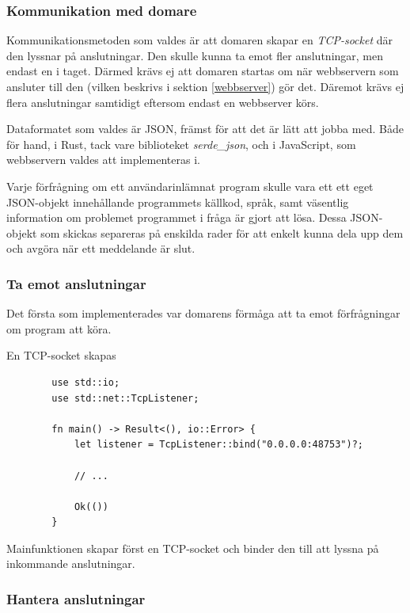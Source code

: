 \documentclass{article}
\begin{document}
\subsubsection{Kommunikation med domare}

Kommunikationsmetoden som valdes är att domaren skapar en \textit{TCP-socket}
där den lyssnar på anslutningar. Den skulle kunna ta emot fler anslutningar, men
endast en i taget. Därmed krävs ej att domaren startas om när webbservern som
ansluter till den (vilken beskrivs i sektion \ref{webbserver}) gör det. Däremot
krävs ej flera anslutningar samtidigt eftersom endast en webbserver körs.

Dataformatet som valdes är JSON, främst för att det är lätt att jobba med. Både
för hand, i Rust, tack vare biblioteket \textit{serde\_json}, och i JavaScript,
som webbservern valdes att implementeras i.

Varje förfrågning om ett användarinlämnat program skulle vara ett ett eget
JSON-objekt innehållande programmets källkod, språk, samt väsentlig information
om problemet programmet i fråga är gjort att lösa. Dessa JSON-objekt som skickas
separeras på enskilda rader för att enkelt kunna dela upp dem och avgöra när ett
meddelande är slut.

\subsubsection{Ta emot anslutningar}

Det första som implementerades var domarens förmåga att ta emot förfrågningar om
program att köra.

\begin{listing}[H]
	\caption{En TCP-socket skapas}
	\begin{verbatim}
		use std::io;
		use std::net::TcpListener;

		fn main() -> Result<(), io::Error> {
			let listener = TcpListener::bind("0.0.0.0:48753")?;

			// ...

			Ok(())
		}
	\end{verbatim}
\end{listing}

Mainfunktionen skapar först en TCP-socket och binder den till att lyssna på
inkommande anslutningar.

\subsubsection{Hantera anslutningar}
\end{document}
